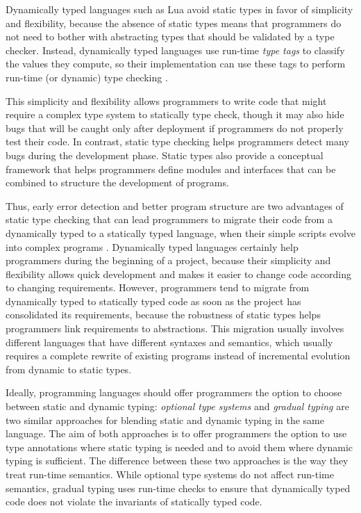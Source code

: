 Dynamically typed languages such as Lua avoid static types in favor of
simplicity and flexibility, because the absence of static types means
that programmers do not need to bother with abstracting types that
should be validated by a type checker.
Instead, dynamically typed languages use run-time \emph{type tags}
to classify the values they compute, so their implementation can use
these tags to perform run-time (or dynamic) type checking
\citep{pierce2002tpl}.

This simplicity and flexibility allows programmers to write code that
might require a complex type system to statically type check,
though it may also hide bugs that will be caught only after deployment
if programmers do not properly test their code.
In contrast, static type checking helps programmers detect many
bugs during the development phase.
Static types also provide a conceptual framework that helps
programmers define modules and interfaces that can be combined to
structure the development of programs.

Thus, early error detection and better program structure are two
advantages of static type checking that can lead programmers to
migrate their code from a dynamically typed to a statically
typed language, when their simple scripts evolve into complex programs
\citep{tobin-hochstadt2006ims}.
Dynamically typed languages certainly help programmers during the
beginning of a project, because their simplicity and flexibility
allows quick development and makes it easier to change code according to
changing requirements.
However, programmers tend to migrate from dynamically typed to
statically typed code as soon as the project has consolidated its
requirements, because the robustness of static types helps
programmers link requirements to abstractions.
This migration usually involves different languages that have
different syntaxes and semantics, which usually requires a complete
rewrite of existing programs instead of incremental evolution from
dynamic to static types.

Ideally, programming languages should offer programmers the
option to choose between static and dynamic typing:
\emph{optional type systems} \citep{bracha2004pluggable} and
\emph{gradual typing} \citep{siek2006gradual} are two similar
approaches for blending static and dynamic typing in the same
language.
The aim of both approaches is to offer programmers the option
to use type annotations where static typing is needed and to avoid
them where dynamic typing is sufficient.
The difference between these two approaches is the way they treat
run-time semantics.
While optional type systems do not affect run-time semantics,
gradual typing uses run-time checks to ensure that dynamically typed
code does not violate the invariants of statically typed code.

